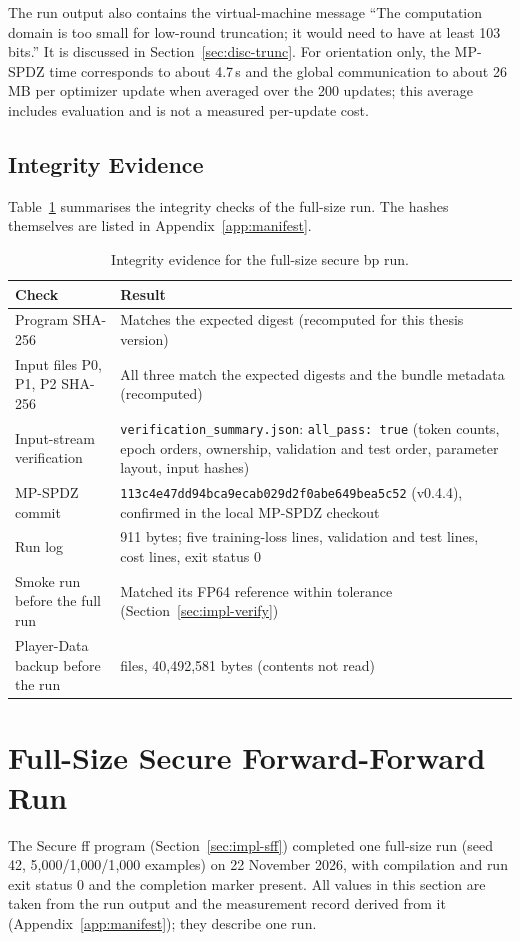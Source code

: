 The run output also contains the virtual-machine message ``The computation domain is too small for low-round truncation; it would need to have at least 103 bits.'' It is discussed in Section~\ref{sec:disc-trunc}. For orientation only, the MP-SPDZ time corresponds to about 4.7\,s and the global communication to about 26\,MB per optimizer update when averaged over the 200 updates; this average includes evaluation and is not a measured per-update cost.

\FloatBarrier
\subsection{Integrity Evidence}\label{sec:res-integrity}
Table~\ref{tab:res-integrity} summarises the integrity checks of the full-size run. The hashes themselves are listed in Appendix~\ref{app:manifest}.

\begin{table}[htbp]
\centering
\small
\begin{tabular}{@{}>{\raggedright\arraybackslash}p{4.6cm}>{\raggedright\arraybackslash}p{9.2cm}@{}}
\toprule
Check & Result \\
\midrule
Program SHA-256 & Matches the expected digest (recomputed for this thesis version) \\
Input files P0, P1, P2 SHA-256 & All three match the expected digests and the bundle metadata (recomputed) \\
Input-stream verification & \texttt{verification\_summary.json}: \texttt{all\_pass: true} (token counts, epoch orders, ownership, validation and test order, parameter layout, input hashes) \\
MP-SPDZ commit & \texttt{113c4e47dd94bca9ecab029d2f0abe649bea5c52} (v0.4.4), confirmed in the local MP-SPDZ checkout \\
Run log & 5{,}911 bytes; five training-loss lines, validation and test lines, cost lines, exit status 0 \\
Smoke run before the full run & Matched its FP64 reference within tolerance (Section~\ref{sec:impl-verify}) \\
Player-Data backup before the run & 33 files, 40{,}492{,}581 bytes (contents not read) \\
\bottomrule
\end{tabular}
\caption{Integrity evidence for the full-size secure \ac{bp} run.}
\label{tab:res-integrity}
\end{table}

\FloatBarrier
\section{Full-Size Secure Forward-Forward Run}\label{sec:res-sff}
The Secure \ac{ff} program (Section~\ref{sec:impl-sff}) completed one full-size run (seed 42, 5{,}000/1{,}000/1{,}000 examples) on 22 November 2026, with compilation and run exit status 0 and the completion marker present. All values in this section are taken from the run output and the measurement record derived from it (Appendix~\ref{app:manifest}); they describe one run.

